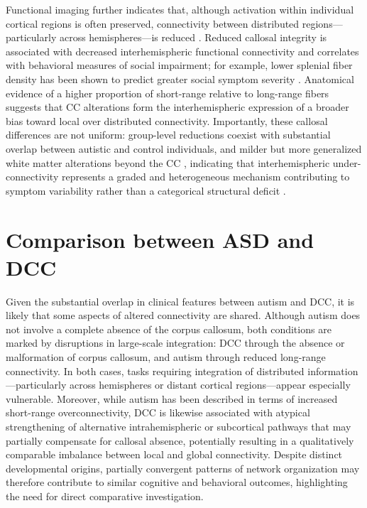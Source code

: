 \documentclass{article}
\begin{document}
Functional imaging further indicates that, although activation within individual cortical regions is often preserved, connectivity between distributed regions—particularly across hemispheres—is reduced \citep{Just2007}. Reduced callosal integrity is associated with decreased interhemispheric functional connectivity and correlates with behavioral measures of social impairment; for example, lower splenial fiber density has been shown to predict greater social symptom severity \citep{Dimond2019}. Anatomical evidence of a higher proportion of short-range relative to long-range fibers \citep{Casanova2002} suggests that CC alterations form the interhemispheric expression of a broader bias toward local over distributed connectivity. Importantly, these callosal differences are not uniform: group-level reductions coexist with substantial overlap between autistic and control individuals, and milder but more generalized white matter alterations beyond the CC \citep{Dimond2019}, indicating that interhemispheric under-connectivity represents a graded and heterogeneous mechanism contributing to symptom variability rather than a categorical structural deficit \citep{Paul2007,Frazier2009}.

\section{Comparison between ASD and DCC}

Given the substantial overlap in clinical features between autism and DCC, it is likely that some aspects of altered connectivity are shared. Although autism does not involve a complete absence of the corpus callosum, both conditions are marked by disruptions in large-scale integration: DCC through the absence or malformation of corpus callosum, and autism through reduced long-range connectivity. In both cases, tasks requiring integration of distributed information—particularly across hemispheres or distant cortical regions—appear especially vulnerable. Moreover, while autism has been described in terms of increased short-range overconnectivity, DCC is likewise associated with atypical strengthening of alternative intrahemispheric or subcortical pathways that may partially compensate for callosal absence, potentially resulting in a qualitatively comparable imbalance between local and global connectivity. Despite distinct developmental origins, partially convergent patterns of network organization may therefore contribute to similar cognitive and behavioral outcomes, highlighting the need for direct comparative investigation.
\end{document}
